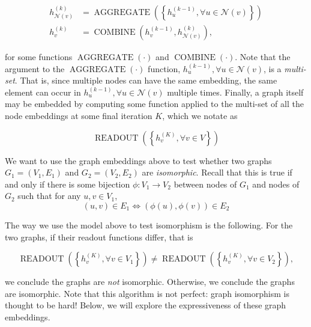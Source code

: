 \documentclass{article}
\numberwithin{figure}{section}
\begin{document}
$$
\begin{aligned}
h_{\mathcal{N}(v)}^{(k)} & =\operatorname{AGGREGATE}\left(\left\{h_u^{(k-1)}, \forall u \in \mathcal{N}(v)\right\}\right) \\
h_v^{(k)} & =\operatorname{COMBINE}\left(h_v^{(k-1)}, h_{\mathcal{N}(v)}^{(k)}\right),
\end{aligned}
$$

\noindent for some functions $\operatorname{AGGREGATE}(\cdot)$ and $\operatorname{COMBINE}(\cdot)$. Note that the argument to the $\operatorname{AGGREGATE}(\cdot)$ function, ${h^{(k-1)}_u, \forall u \in \mathcal{N}(v)}$, is a \textit{multi-set}.
That is, since multiple nodes can have the same embedding, the same element can occur in ${h^{(k-1)}_u, \forall u \in \mathcal{N}(v)}$ multiple times.
Finally, a graph itself may be embedded by computing some function applied to the multi-set of all the node embeddings at some final iteration $K$, which we notate as 

$$\operatorname { READOUT }\left(\left\{h_v^{(K)}, \forall v \in V\right\}\right)$$

We want to use the graph embeddings above to test whether two graphs $G_1 = (V_1, E_1)$ and $G_2 = (V_2, E_2)$ are \textit{isomorphic}.
Recall that this is true if and only if there is some bijection $\phi : V_1 \rightarrow V_2$ between nodes of $G_1$ and nodes of $G_2$ such that for any $u, v \in V_1$, 
$$(u, v) \in E_1 \Leftrightarrow (\phi(u), \phi(v)) \in E_2$$

The way we use the model above to test isomorphism is the following. For the two graphs, if their readout functions differ, that is 

$$\operatorname { READOUT }\left(\left\{h_v^{(K)}, \forall v \in V_1\right\}\right) \neq \operatorname { READOUT }\left(\left\{h_v^{(K)}, \forall v \in V_2\right\}\right),$$

we conclude the graphs are \textit{not} isomorphic. Otherwise, we conclude the graphs are isomorphic. Note that this algorithm is not perfect: graph isomorphism is thought to be hard! Below, we will explore the expressiveness of these graph embeddings. 
\end{document}
